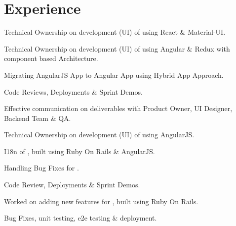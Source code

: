 \documentclass[]{my-resume-openfont}
\begin{document}
\hfill
\begin{minipage}[t]{0.66\textwidth}


\section{Experience}

\vspace{\topsep} %
\begin{tightemize}
\item{ Technical Ownership on development (UI) of  using React \& Material-UI.}
\item{ Technical Ownership on development (UI) of  using Angular \& Redux with component based Architecture.}
\item Migrating AngularJS App to Angular App using Hybrid App Approach.
\item Code Reviews, Deployments \& Sprint Demos.
\item Effective communication on deliverables with Product Owner, UI Designer, Backend Team \& QA.
\end{tightemize}
\sectionsep

\begin{tightemize}
\item Technical Ownership on development (UI) of  using AngularJS.
\item I18n of , built using Ruby On Rails \& AngularJS.
\item Handling Bug Fixes for .
\item Code Review, Deployments \& Sprint Demos.
\end{tightemize}
\sectionsep

\begin{tightemize}
\item Worked on adding new features for , built using Ruby On Rails.
\item Bug Fixes, unit testing, e2e testing \& deployment.
\end{tightemize}
\sectionsep


\end{minipage}
\end{document}
